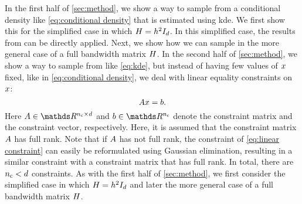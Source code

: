 In the first half of \cref{sec:method}, we show a way to sample from a conditional density like \cref{eq:conditional density} that is estimated using \ac{kde}. 
We first show this for the simplified case in which $H=h^2 I_{d}$. 
In this simplified case, the results from \textcite{hyndman1996estimating, holmes2007fast} can be directly applied.
Next, we show how we can sample in the more general case of a full bandwidth matrix $H$.
In the second half of \cref{sec:method}, we show a way to sample from  like \cref{eq:kde}, but instead of having few values of $x$ fixed, like in \cref{eq:conditional density}, we deal with linear equality constraints on $x$:
\begin{equation}
	\label{eq:linear constraint}
	A x = b.
\end{equation}
Here $\constraintmatrix \in \realnumbers^{\numberofconstraints \times \dimension}$ and $\constraintvector \in \realnumbers^{\numberofconstraints}$ denote the constraint matrix and the constraint vector, respectively. 
Here, it is assumed that the constraint matrix $A$ has full rank.
Note that if $A$ has not full rank, the constraint of \cref{eq:linear constraint} can easily be reformulated using Gaussian elimination, resulting in a similar constraint with a constraint matrix that has full rank.
In total, there are $n_\mathrm{c} < d$ constraints.
As with the first half of \cref{sec:method}, we first consider the simplified case in which $H=h^2 I_{d}$ and later the more general case of a full bandwidth matrix $H$.

